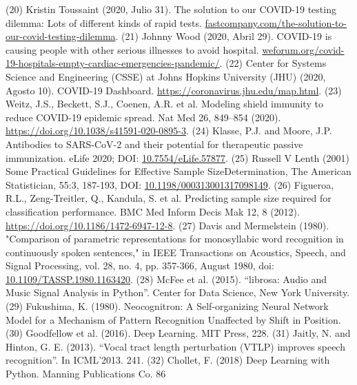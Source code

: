 \documentclass{nle}
\begin{document}
\begin{thebibliography}{}
   (20) Kristin Toussaint (2020, Julio 31). The solution to our COVID-19 testing dilemma: Lots of different kinds of rapid tests. \url{fastcompany.com/the-solution-to-our-covid-testing-dilemma}.
   (21) Johnny Wood (2020, Abril 29). COVID-19 is causing people with other serious illnesses to avoid hospital.
   \url{weforum.org/covid-19-hospitals-empty-cardiac-emergencies-pandemic/}.
   (22) Center for Systems Science and Engineering (CSSE) at Johns Hopkins University (JHU) (2020, Agosto 10). COVID-19 Dashboard. \url{https://coronavirus.jhu.edu/map.html}.
   (23) Weitz, J.S., Beckett, S.J., Coenen, A.R. et al. Modeling shield immunity to reduce COVID-19 epidemic spread. Nat Med 26, 849–854 (2020). \url{https://doi.org/10.1038/s41591-020-0895-3}.
   (24) Klasse, P.J. and Moore, J.P. Antibodies to SARS-CoV-2 and their potential for therapeutic passive immunization. eLife 2020; DOI: \url{10.7554/eLife.57877}.
   (25) Russell V Lenth (2001) Some Practical Guidelines for Effective Sample SizeDetermination, The American Statistician, 55:3, 187-193, DOI: \url{10.1198/000313001317098149}.
   (26) Figueroa, R.L., Zeng-Treitler, Q., Kandula, S. et al. Predicting sample size required for classification performance. BMC Med Inform Decis Mak 12, 8 (2012). \url{https://doi.org/10.1186/1472-6947-12-8}.
   (27) Davis and Mermelstein (1980). "Comparison of parametric representations for monosyllabic word recognition in continuously spoken sentences," in IEEE Transactions on Acoustics, Speech, and Signal Processing, vol. 28, no. 4, pp. 357-366, August 1980, doi: \url{10.1109/TASSP.1980.1163420}.
   (28) McFee et al. (2015). “librosa: Audio and Music Signal Analysis in Python”. Center for Data Science, New York University.
   (29) Fukushima, K. (1980). Neocognitron: A Self-organizing Neural Network Model for a Mechanism of Pattern Recognition Unaffected by Shift in Position.
   (30) Goodfellow et al. (2016). Deep Learning. MIT Press, 228.
   (31) Jaitly, N. and Hinton, G. E. (2013). “Vocal tract length perturbation (VTLP) improves speech recognition”. In ICML’2013. 241.
   (32) Chollet, F. (2018) Deep Learning with Python. Manning Publications Co. 86

\end{thebibliography}
\end{document}
